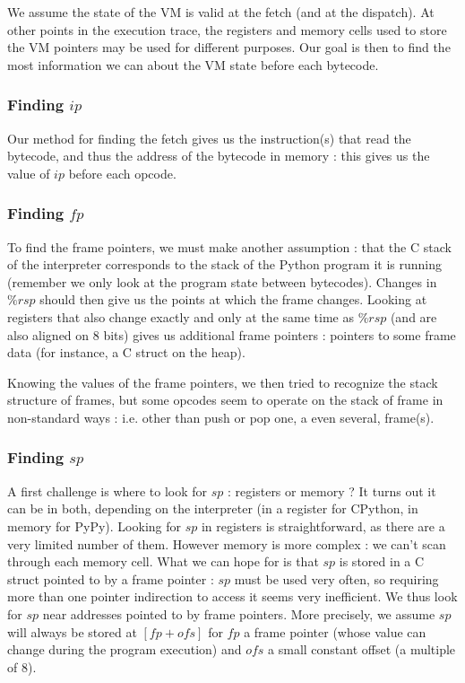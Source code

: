 \documentclass[french]{article}
\begin{document}
We assume the state of the VM is valid at the fetch (and at the dispatch). At other points in the execution trace, the registers and memory cells used to store the VM pointers may be used for different purposes. Our goal is then to find the most information we can about the VM state before each bytecode.

\subsubsection{Finding $ip$}

Our method for finding the fetch gives us the instruction(s) that read the bytecode, and thus the address of the bytecode in memory : this gives us the value of $ip$ before each opcode.

\subsubsection{Finding $fp$}

To find the frame pointers, we must make another assumption : that the C stack of the interpreter corresponds to the stack of the Python program it is running (remember we only look at the program state between bytecodes). Changes in $\%rsp$ should then give us the points at which the frame changes. Looking at registers that also change exactly and only at the same time as $\%rsp$ (and are also aligned on 8 bits) gives us additional frame pointers : pointers to some frame data (for instance, a C struct on the heap).

Knowing the values of the frame pointers, we then tried to recognize the stack structure of frames, but some opcodes seem to operate on the stack of frame in non-standard ways : i.e. other than push or pop one, a even several, frame(s).

\subsubsection{Finding $sp$}

A first challenge is where to look for $sp$ : registers or memory ? It turns out it can be in both, depending on the interpreter (in a register for CPython, in memory for PyPy). Looking for $sp$ in registers is straightforward, as there are a very limited number of them. However memory is more complex : we can't scan through each memory cell. What we can hope for is that $sp$ is stored in a C struct pointed to by a frame pointer : $sp$ must be used very often, so requiring more than one pointer indirection to access it seems very inefficient. We thus look for $sp$ near addresses pointed to by frame pointers.  More precisely, we assume $sp$ will always be stored at $[fp + ofs]$ for $fp$ a frame pointer (whose value can change during the program execution) and $ofs$ a small constant offset (a multiple of 8).
\end{document}
